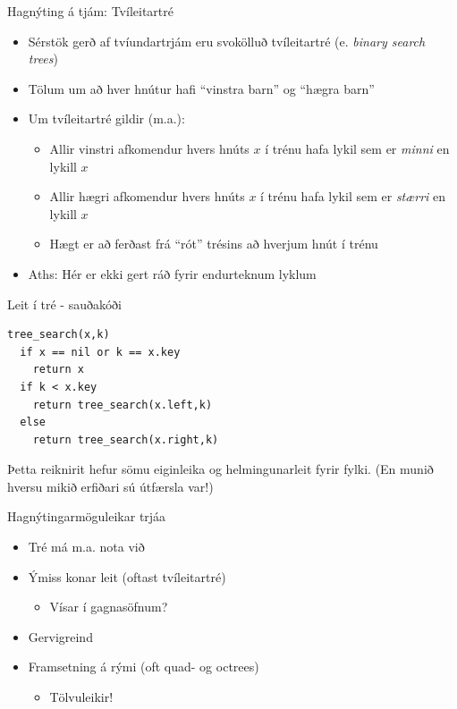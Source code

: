\documentclass{beamer}
\begin{document}
\begin{frame}{Hagnýting á tjám: Tvíleitartré}
\begin{itemize}
 \item Sérstök gerð af tvíundartrjám eru svokölluð tvíleitartré (e. \emph{binary search trees})
 \item Tölum um að hver hnútur hafi ``vinstra barn'' og ``hægra barn''
 \item Um tvíleitartré gildir (m.a.):
 \begin{itemize}
  \item Allir vinstri afkomendur hvers hnúts $x$ í trénu hafa lykil sem er \emph{minni} en lykill $x$
  \item Allir hægri afkomendur hvers hnúts $x$ í trénu hafa lykil sem er \emph{stærri} en lykill $x$
  \item Hægt er að ferðast frá ``rót'' trésins að hverjum hnút í trénu
 \end{itemize}
 \item Aths: Hér er ekki gert ráð fyrir endurteknum lyklum
\end{itemize}
\end{frame}

\begin{frame}[fragile]{Leit í tré - sauðakóði}

\begin{verbatim}
tree_search(x,k)
  if x == nil or k == x.key
    return x
  if k < x.key
    return tree_search(x.left,k)
  else
    return tree_search(x.right,k)
\end{verbatim}
Þetta reiknirit hefur sömu eiginleika og helmingunarleit fyrir fylki. (En munið hversu mikið erfiðari sú útfærsla var!)
\end{frame}

\begin{frame}{Hagnýtingarmöguleikar trjáa}
\begin{itemize}
 \item Tré má m.a. nota við
  \item Ýmiss konar leit (oftast tvíleitartré)
  \begin{itemize}
   \item Vísar í gagnasöfnum?
  \end{itemize}
  \item Gervigreind
  \item Framsetning á rými (oft quad- og octrees)
  \begin{itemize}
   \item Tölvuleikir!
  \end{itemize}
\end{itemize}
\end{frame}
\end{document}
